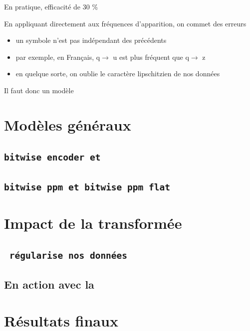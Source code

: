\documentclass{beamer}
\newcommand{\tech}[1]{\tt{#1}}
\newcommand{\relief}[1]{{\color{structureTextColor} #1}}
\newcommand{\blue}[1]{{\color{regularblue} #1}}
\theoremstyle{theoreme}
\begin{document}
\begin{frame}
  \frametitle{\secname{}}
  \framesubtitle{\subsecname{}}
  En pratique, efficacité de \relief{30 \%}
  \pause

  \bigskip

  En appliquant directement  aux \relief{fréquences} d'apparition,
  on commet des erreurs
  \begin{itemize}
    \item\pause un symbole n'est pas \relief{indépendant} des précédents
    \item\pause par exemple, en Français, q$\to$\blue{u} est plus fréquent que q$\to$\blue{z}
    \item\pause en quelque sorte, on oublie le caractère \relief{lipschitzien} de nos données
  \end{itemize}

  \relief{Il faut donc un modèle}

\end{frame}

\section{Modèles généraux}
\subsection{\tech{bitwise encoder} et \tech{}}
\subsection{\tech{bitwise ppm} et \tech{bitwise ppm flat}}

\section{Impact de la transformée}
\subsection{\tech{} régularise nos données}
\subsection{En action avec la \tech{}}

\section{Résultats finaux}
\end{document}
